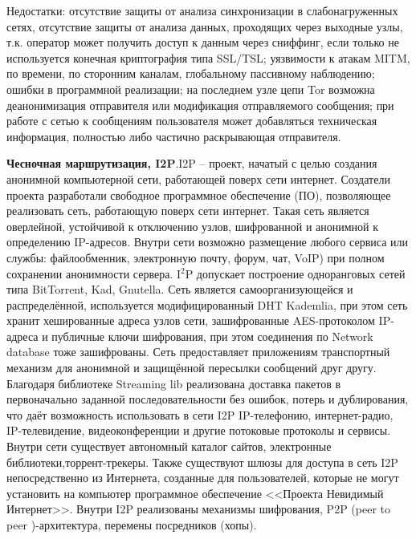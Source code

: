 Недостатки: отсутствие защиты от анализа синхронизации в слабонагруженных сетях, отсутствие защиты   от анализа данных, проходящих через выходные узлы, т.к. оператор может получить доступ к данным через сниффинг, если только не используется конечная криптография типа SSL/TSL; уязвимости к атакам MITM,  по времени, по сторонним каналам, глобальному пассивному наблюдению;  %
ошибки  в программной реализации; на последнем узле цепи Tor возможна деанонимизация отправителя или модификация отправляемого сообщения;  при работе с сетью  к сообщениям пользователя может добавляться техническая информация, полностью либо частично раскрывающая отправителя. %

\textbf{Чесночная маршрутизация, I2P}.I2P --  проект, начатый с целью создания анонимной компьютерной сети, работающей поверх сети интернет. Создатели проекта разработали свободное программное обеспечение (ПО), позволяющее реализовать сеть, работающую поверх сети интернет. Такая сеть является оверлейной, устойчивой к отключению узлов, шифрованной и анонимной к определению IP-адресов. Внутри сети возможно размещение любого сервиса или службы: файлообменник, электронную почту, форум, чат, VoIP) при полном сохранении анонимности сервера. I$ ^{2} $P допускает построение одноранговых сетей типа BitTorrent, Kad, Gnutella. %
Сеть является самоорганизующейся и распределённой, используется модифицированный DHT Kademlia, при этом сеть хранит хешированные адреса узлов сети, зашифрованные AES-протоколом IP-адреса и публичные ключи шифрования, при этом соединения по Network database тоже зашифрованы.	Сеть предоставляет приложениям транспортный механизм для анонимной и защищённой пересылки сообщений друг другу. %
Благодаря библиотеке Streaming lib реализована  доставка пакетов  в первоначально заданной последовательности без ошибок, потерь и дублирования, что даёт возможность использовать в сети I2P IP-телефонию, интернет-радио, IP-телевидение, видеоконференции и другие потоковые протоколы и сервисы. \cite{I2P1} %
Внутри сети  существует автономный каталог сайтов, электронные библиотеки,торрент-трекеры. Также существуют шлюзы для доступа в сеть I2P непосредственно из Интернета, созданные  для пользователей, которые  не могут установить на компьютер программное обеспечение <<Проекта Невидимый Интернет>>. Внутри I2P реализованы механизмы шифрования, P2P (peer to peer )-архитектура, перемены посредников (хопы).


